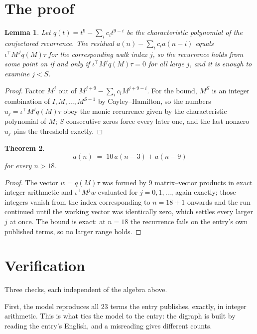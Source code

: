\documentclass[11pt,a4paper]{article}
\theoremstyle{plain}
\newtheorem{theorem}{Theorem}
\newtheorem{lemma}[theorem]{Lemma}
\theoremstyle{definition}
\begin{document}
\section{The proof}

\begin{lemma}\label{lem:crit}
Let $q(t)=t^{9}-\sum_i c_it^{9-i}$ be the characteristic polynomial of the
conjectured recurrence. The residual $a(n)-\sum_ic_ia(n-i)$ equals
$\iota^{\!\top}M^{\,j}q(M)\tau$ for the corresponding walk index $j$, so the recurrence
holds from some point on if and only if $\iota^{\!\top}M^{j}q(M)\tau=0$ for all large $j$,
and it is enough to examine $j<S$.
\end{lemma}

\begin{proof}
Factor $M^{j}$ out of $M^{j+9}-\sum_ic_iM^{j+9-i}$. For the bound, $M^{S}$
is an integer combination of $I,M,\dots,M^{S-1}$ by Cayley--Hamilton, so the numbers
$u_j=\iota^{\!\top}M^{j}q(M)\tau$ obey the monic recurrence given by the characteristic
polynomial of $M$; $S$ consecutive zeros force every later one, and the last nonzero $u_j$
pins the threshold exactly.
\end{proof}

\begin{theorem}
\[
a(n)\;=\;10\,a(n-3) + a(n-9)
\]
for every $n>18$.
\end{theorem}

\begin{proof}
The vector $w=q(M)\tau$ was formed by $9$ matrix--vector products in exact integer
arithmetic and $\iota^{\!\top}M^{j}w$ evaluated for $j=0,1,\dots$, again exactly; those
integers vanish from the index corresponding to $n=18+1$ onwards and the run continued
until the working vector was identically zero, which settles every larger $j$ at once. The bound is exact: at $n=18$ the recurrence fails on the entry's own published terms, so no larger range holds.
\end{proof}

\section{Verification}

Three checks, each independent of the algebra above.

First, the model reproduces all $23$ terms the entry publishes, exactly, in integer
arithmetic. This is what ties the model to the entry: the digraph is built by reading the
entry's English, and a misreading gives different counts.
\end{document}
